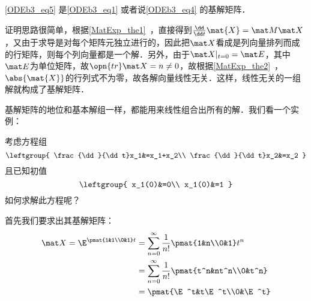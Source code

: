 \begin{theorem}{}
\autoref{ODEb3_eq5} 是\autoref{ODEb3_eq1} 或者说\autoref{ODEb3_eq4} 的基解矩阵．
\end{theorem}

证明思路很简单，根据\autoref{MatExp_the1}~，直接得到$\frac{\dd}{\dd t}\mat{X}=\mat M\mat X$，又由于求导是对每个矩阵元独立进行的，因此把$\mat X$看成是列向量排列而成的行矩阵，则每个列向量都是一个解．另外，由于$\mat X|_{t=0}=\mat E$，其中$\mat E$为单位矩阵，故$\opn{tr}\mat X=n\not=0$，故根据\autoref{MatExp_the2}~，$\abs{\mat{X}}$的行列式不为零，故各解向量线性无关．这样，线性无关的一组解就构成了基解矩阵．


基解矩阵的地位和基本解组一样，都能用来线性组合出所有的解．我们看一个实例：

\begin{example}{}
考虑方程组
\begin{equation}
\leftgroup{
    \frac{\dd}{\dd t}x_1&=x_1+x_2\\
    \frac{\dd}{\dd t}x_2&=x_2
}
\end{equation}
且已知初值
\begin{equation}
\leftgroup{
    x_1(0)&=0\\
    x_1(0)&=1
}
\end{equation}
如何求解此方程呢？

首先我们要求出其基解矩阵：
\begin{equation}
\begin{aligned}
\mat X=\E^{\pmat{1&1\\0&1}t}&=\sum_{n=0}^\infty\frac{1}{n!}\pmat{1&n\\0&1}t^n\\
&=\sum_{n=0}^\infty\frac{1}{n!}\pmat{t^n&nt^n\\0&t^n}\\
&=\pmat{\E^t&t\E^t\\0&\E^t}
\end{aligned}
\end{equation}





\end{example}




















